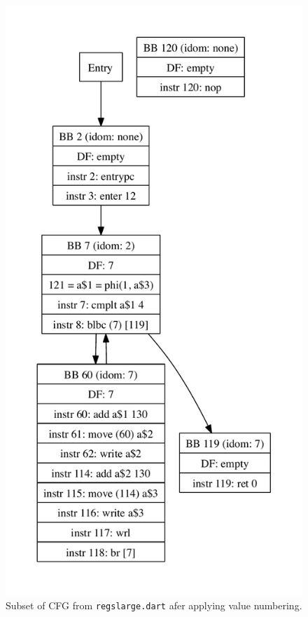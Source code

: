 \documentclass[10pt,twocolumn]{article}
\begin{document}
\begin{figure}
\begin{center}
\vspace{-1in}
  \includegraphics[height=0.75\paperheight]{figs/andre3.pdf}
\begin{minipage}{0.95\columnwidth}
  \caption{\label{fig:regslarge-gce} Subset of CFG from \texttt{regslarge.dart} afer applying value numbering.}
\end{minipage}
\end{center}
\end{figure}





\end{document}
